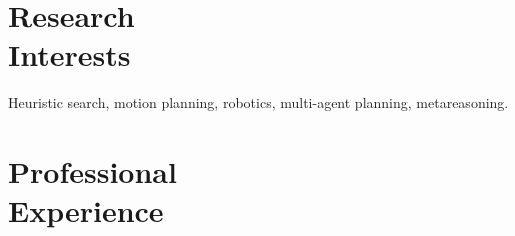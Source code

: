 \documentclass[margin, 10pt]{res} %
\begin{document}
\begin{resume}

 
\section{Research\\ Interests}  

Heuristic search, motion planning, robotics, multi-agent planning, metareasoning.\\





\section{Professional\\Experience}


\end{resume}
\end{document}
